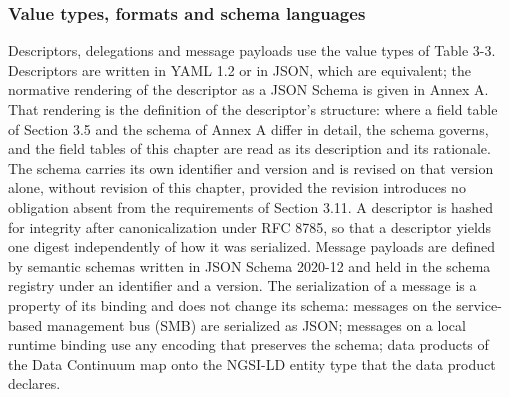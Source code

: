 \hypertarget{value-types-formats-and-schema-languages}{%
\subsubsection{Value types, formats and schema languages}\label{value-types-formats-and-schema-languages}}

Descriptors, delegations and message payloads use the value types of
Table 3-3. Descriptors are written in YAML 1.2 or in JSON, which are
equivalent; the normative rendering of the descriptor as a JSON Schema
is given in Annex A. That rendering is the definition of the
descriptor's structure: where a field table of Section 3.5 and the
schema of Annex A differ in detail, the schema governs, and the field
tables of this chapter are read as its description and its rationale.
The schema carries its own identifier and version and is revised on that
version alone, without revision of this chapter, provided the revision
introduces no obligation absent from the requirements of Section 3.11. A
descriptor is hashed for integrity after canonicalization under RFC
8785, so that a descriptor yields one digest independently of how it was
serialized. Message payloads are defined by semantic schemas written in
JSON Schema 2020-12 and held in the schema registry under an identifier
and a version. The serialization of a message is a property of its
binding and does not change its schema: messages on the service-based
management bus (SMB) are serialized as JSON; messages on a local runtime
binding use any encoding that preserves the schema; data products of the
Data Continuum map onto the NGSI-LD entity type that the data product
declares.

